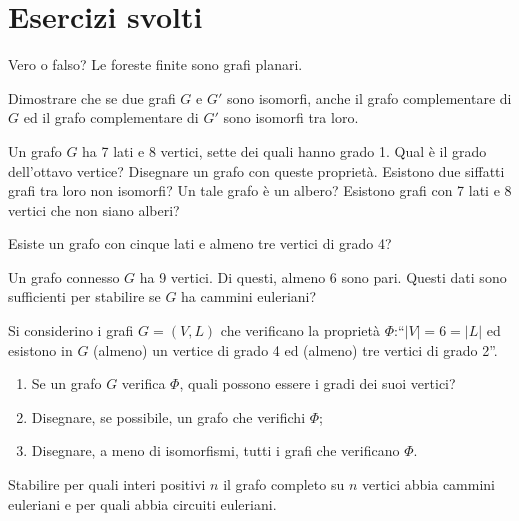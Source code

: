\section{Esercizi svolti}
	\begin{exsbox}
		Vero o falso? Le foreste finite sono grafi planari.
	\end{exsbox}
	\begin{exsbox}
		Dimostrare che se due grafi $G$ e $G′$ sono isomorfi, anche il grafo complementare di $G$ ed il grafo complementare di $G′$ sono isomorfi tra loro.
	\end{exsbox}
	\begin{exsbox}
		Un grafo $G$ ha 7 lati e 8 vertici, sette dei quali hanno grado 1. Qual è il grado dell’ottavo vertice?
		Disegnare un grafo con queste proprietà. Esistono due siffatti grafi tra loro non isomorfi? Un tale grafo è un albero? Esistono grafi con 7 lati e 8 vertici che non siano alberi?
	\end{exsbox}
	\begin{exsbox}
		Esiste un grafo con cinque lati e almeno tre vertici di grado 4?
	\end{exsbox}
	\begin{exsbox}
		Un grafo connesso $G$ ha 9 vertici. Di questi, almeno 6 sono pari. Questi dati sono sufficienti per stabilire se $G$ ha cammini euleriani?
	\end{exsbox}
	\begin{exsbox}
		Si considerino i grafi $G=(V,L)$ che verificano la proprietà $\Phi$:``$|V|=6=|L|$ ed esistono in $G$ (almeno) un vertice di grado 4 ed (almeno) tre vertici di grado 2''.
		\begin{enumerate}
			\item Se un grafo $G$ verifica $\Phi$, quali possono essere i gradi dei suoi vertici?
			\item Disegnare, se possibile, un grafo che verifichi $\Phi$;
			\item Disegnare, a meno di isomorfismi, tutti i grafi che verificano $\Phi$.
		\end{enumerate}
	\end{exsbox}
	\begin{exsbox}
		Stabilire per quali interi positivi $n$ il grafo completo su $n$ vertici abbia cammini euleriani e per quali abbia circuiti euleriani.
	\end{exsbox}